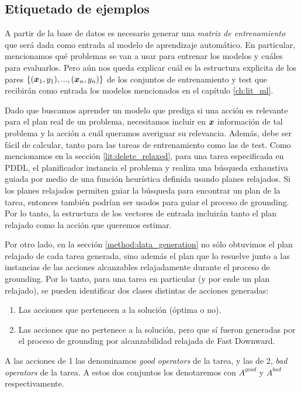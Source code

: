 \subsection{Etiquetado de ejemplos}
\label{method:labeling}

A partir de la base de datos es necesario generar una \emph{matriz de
entrenamiento} que será dada como entrada al modelo de aprendizaje automático.
En particular, mencionamos qué problemas se van a usar para entrenar los modelos
y cuáles para evaluarlos. Pero aún nos queda explicar cuál es la estructura
explicita de los pares $\{(\boldsymbol{x}_1, y_1), ..., (\boldsymbol{x}_n, y_n)\}$ de los
conjuntos de entrenamiento y test que recibirán como entrada los modelos
mencionados en el capítulo \ref{ch:lit_ml}.

Dado que buscamos aprender un modelo que prediga si una acción es relevante para
el plan real de un problema, necesitamos incluir en $\boldsymbol{x}$ información de
tal problema y la acción a cuál queramos averiguar su relevancia. Además, debe
ser fácil de calcular, tanto para las tareas de entrenamiento como las de test.
Como mencionamos en la sección \ref{lit:delete_relaxed}, para una tarea
especificada en PDDL, el planificador instancia el problema y realiza una
búsqueda exhaustiva guiada por medio de una función heurística definida usando
planes relajados. Si los planes relajados permiten guiar la búsqueda para
encontrar un plan de la tarea, entonces también podrían ser usados para guiar el
proceso de grounding. Por lo tanto, la estructura de los vectores de entrada
incluirán tanto el plan relajado como la acción que queremos estimar.

Por otro lado, en la sección \ref{method:data_generation} no sólo obtuvimos el
plan relajado de cada tarea generada, sino además el plan que lo resuelve junto
a las instancias de las acciones alcanzables relajadamente durante el proceso de
grounding. Por lo tanto, para una tarea en particular (y por ende un plan
relajado), se pueden identificar dos clases distintas de acciones generadas:

\begin{enumerate}
    \item Las acciones que pertenecen a la solución (óptima o no).
    \item Las acciones que no pertenece a la solución, pero que sí fueron
    generadas por el proceso de grounding por alcanzabilidad relajada de Fast
    Downward.
\end{enumerate}

A las acciones de 1 las denominamos \emph{good operators} de la tarea, y las de
2, \emph{bad operators} de la tarea. A estos dos conjuntos los denotaremos con
$A^{good}$ y $A^{bad}$ respectivamente.

